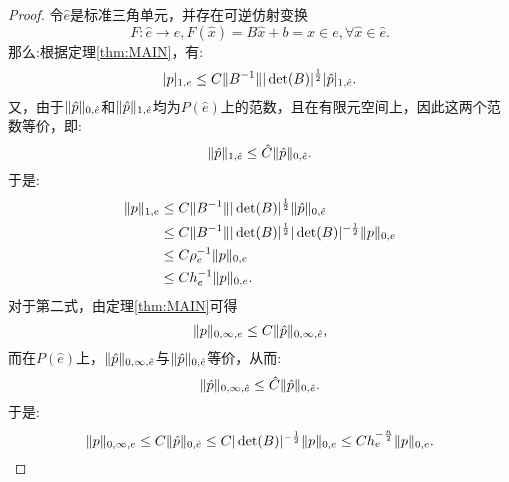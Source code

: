 \begin{proof}
    令$\hat{e}$是标准三角单元，并存在可逆仿射变换
    \begin{equation}
        F:\hat{e}\rightarrow e, F(\hat{x})=B\hat{x}+b=x\in e,\forall\hat{x}\in\hat{e}.
    \end{equation}
    那么:根据定理\ref{thm:MAIN}，有:
    \begin{equation}
        |p|_{1,e}\le C\|B^{-1}\||\det(B)|^{\frac{1}{2}}|\hat{p}|_{1,\hat{e}}.
    \end{equation}
    又，由于$\|\hat{p}\|_{0,\hat{e}}$和$\|\hat{p}\|_{1,\hat{e}}$均为$P(\hat{e})$上的范数，且在有限元空间上，因此这两个范数等价，即:
    \begin{equation}
        \|\hat{p}\|_{1,\hat{e}}\le \hat{C}\|\hat{p}\|_{0,\hat{e}}.
    \end{equation}
    于是:
    \begin{equation}
        \begin{aligned}
            \|p\|_{1,e}&\le C\|B^{-1}\||\det(B)|^{\frac{1}{2}}\|\hat{p}\|_{0,\hat{e}}\\
            &\le C\|B^{-1}\||\det(B)|^{\frac{1}{2}}|\det(B)|^{-\frac{1}{2}}\|p\|_{0,e}\\
            &\le C\rho_{e}^{-1}\|p\|_{0,e}\\
            &\le Ch_{e}^{-1}\|p\|_{0,e}.
        \end{aligned}
    \end{equation}
    对于第二式，由定理\ref{thm:MAIN}可得
    \begin{equation}
        \|p\|_{0,\infty,e}\le C\|\hat{p}\|_{0,\infty,\hat{e}},
    \end{equation}
    而在$P(\hat{e})$上，$\|\hat{p}\|_{0,\infty,\hat{e}}$与$\|\hat{p}\|_{0,\hat{e}}$等价，从而:
    \begin{equation}
        \|\hat{p}\|_{0,\infty,\hat{e}}\le\hat{C}\|\hat{p}\|_{0,\hat{e}}.
    \end{equation}
    于是:
    \begin{equation}
        \|p\|_{0,\infty,e}\le C\|\hat{p}\|_{0,\hat{e}}\le C|\det(B)|^{-\frac{1}{2}}\|p\|_{0,e}\le Ch_{e}^{-\frac{n}{2}}\|p\|_{0,e}.
    \end{equation}
\end{proof}